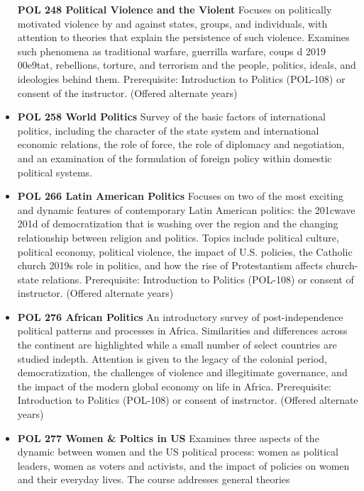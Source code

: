 \documentclass[
  letterpaper,
]{scrbook}
\begin{document}
\begin{itemize}
  \textbf{POL 248 Political Violence and the Violent} Focuses on
  politically motivated violence by and against states, groups, and
  individuals, with attention to theories that explain the persistence
  of such violence. Examines such phenomena as traditional warfare,
  guerrilla warfare, coups d 2019 00e9tat, rebellions, torture, and
  terrorism and the people, politics, ideals, and ideologies behind
  them. Prerequisite: Introduction to Politics (POL-108) or consent of
  the instructor. (Offered alternate years)\\
\item
  \textbf{POL 258 World Politics} Survey of the basic factors of
  international politics, including the character of the state system
  and international economic relations, the role of force, the role of
  diplomacy and negotiation, and an examination of the formulation of
  foreign policy within domestic political systems.\\
\item
  \textbf{POL 266 Latin American Politics} Focuses on two of the most
  exciting and dynamic features of contemporary Latin American politics:
  the 201cwave 201d of democratization that is washing over the region
  and the changing relationship between religion and politics. Topics
  include political culture, political economy, political violence, the
  impact of U.S. policies, the Catholic church 2019s role in politics,
  and how the rise of Protestantism affects church-state relations.
  Prerequisite: Introduction to Politics (POL-108) or consent of
  instructor. (Offered alternate years)
\item
  \textbf{POL 276 African Politics} An introductory survey of
  post-independence political patterns and processes in Africa.
  Similarities and differences across the continent are highlighted
  while a small number of select countries are studied indepth.
  Attention is given to the legacy of the colonial period,
  democratization, the challenges of violence and illegitimate
  governance, and the impact of the modern global economy on life in
  Africa. Prerequisite: Introduction to Politics (POL-108) or consent of
  instructor. (Offered alternate years)\\
\item
  \textbf{POL 277 Women \& Poltics in US} Examines three aspects of the
  dynamic between women and the US political process: women as political
  leaders, women as voters and activists, and the impact of policies on
  women and their everyday lives. The course addresses general theories

\end{itemize}
\end{document}
